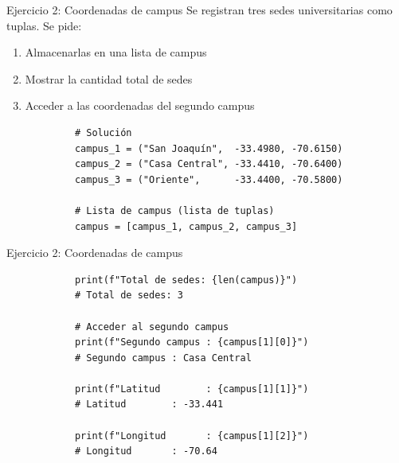 \documentclass{beamer}
\begin{document}
    \begin{frame}[fragile, t]{Ejercicio 2: Coordenadas de campus}
        Se registran tres sedes universitarias como tuplas. Se pide:
        \begin{enumerate}
            \item Almacenarlas en una lista de campus
            \item Mostrar la cantidad total de sedes
            \item Acceder a las coordenadas del segundo campus
        \end{enumerate}
        \begin{verbatim}
            # Solución
            campus_1 = ("San Joaquín",  -33.4980, -70.6150)
            campus_2 = ("Casa Central", -33.4410, -70.6400)
            campus_3 = ("Oriente",      -33.4400, -70.5800)

            # Lista de campus (lista de tuplas)
            campus = [campus_1, campus_2, campus_3]
        \end{verbatim}
    \end{frame}

    \begin{frame}[fragile, t]{Ejercicio 2: Coordenadas de campus}
        \begin{verbatim}
            print(f"Total de sedes: {len(campus)}")
            # Total de sedes: 3
             
            # Acceder al segundo campus
            print(f"Segundo campus : {campus[1][0]}")
            # Segundo campus : Casa Central
             
            print(f"Latitud        : {campus[1][1]}")
            # Latitud        : -33.441
             
            print(f"Longitud       : {campus[1][2]}")
            # Longitud       : -70.64
        \end{verbatim}
    \end{frame}
\end{document}
